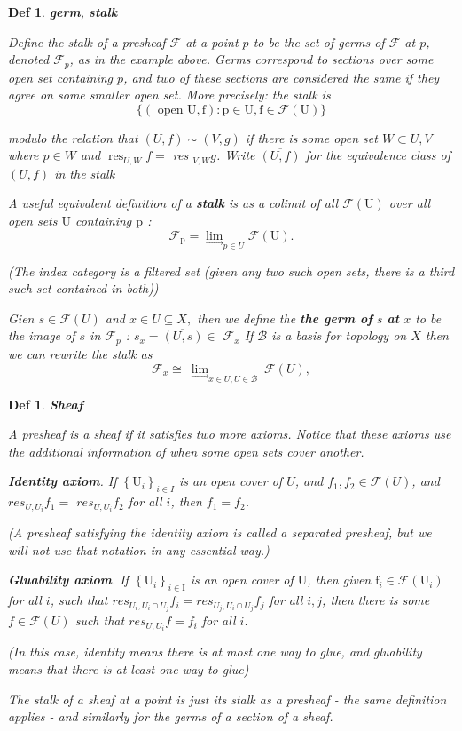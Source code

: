 \documentclass{article}
\newtheorem{definition}[theorem]{Def}
\begin{document}
\begin{definition}
    \textbf{germ},
    \textbf{stalk}

    Define the stalk of a presheaf $\mathcal{F}$ at a point $p$ to be the set of germs of $\mathcal{F}$ at $p$, denoted $\mathcal{F}_{p}$, as in the example above. Germs correspond to sections over some open set containing $p$, and two of these sections are considered the same if they agree on some smaller open set. More precisely: the stalk is
$$
\{(\text { open } \mathrm{U},\mathrm{f}): \mathrm{p} \in \mathrm{U}, \mathrm{f} \in \mathcal{F}(\mathrm{U})\}
$$

modulo the relation that $(U,f) \sim(V,g)$ if there is some open set $W \subset U, V$ where $p \in W$ and $\operatorname{res}_{U, W} f=$ res $_{V, W} g$. Write $\overline{(U,f)}$ for the equivalence class of $(U,f)$ in the stalk

A useful equivalent definition of a \textbf{stalk} is as a colimit of all $\mathcal{F}(\mathrm{U})$ over all open sets $\mathrm{U}$ containing $\mathrm{p}$ :
$$
\mathcal{F}_{\mathrm{p}}={\lim _{\longrightarrow} }_{p\in U}\mathcal{F}(\mathrm{U}) .
$$

(The index category is a filtered set (given any two such open sets, there is a third such set contained in both))

Gien $s\in{\mathcal{F}}(U)$ and $x\in U\subseteq X,$ then we define the \textbf{the germ of} $s$ \textbf{at} $x$ to be the image of $s$ in $\mathcal{F}_{p}$ : $s_{x}=\overline{{{(U,s)}}}\in$  ${\mathcal{F}}_{x}$ 
If $\mathcal B$ is a basis for topology on $X$  then we can rewrite the stalk as
$$
{\mathcal{F}}_{x}\cong\
{\lim _{\longrightarrow} }_{ x\in U,U\in{\mathcal{B}}}\ {\mathcal{F}}(U), 
$$
\end{definition}
\begin{definition}
\textbf{Sheaf}

A presheaf is a sheaf if it satisfies two more axioms. Notice that these axioms use the additional information of when some open sets cover another.

\textbf{Identity axiom}. If $\left\{\mathrm{U}_{i}\right\}_{i \in I}$ is an open cover of $U$, and $f_{1}, f_{2} \in \mathcal{F}(U)$, and $res_{U, U_{i}} f_{1}=$ $res_{U, U_{i}} f_{2}$ for all $i$, then $f_{1}=f_{2}$.

(A presheaf satisfying the identity axiom is called a separated presheaf, but we will not use that notation in any essential way.)

\textbf{Gluability axiom}. If $\left\{\mathrm{U}_{i}\right\}_{i \in \mathrm{I}}$ is an open cover of $\mathrm{U}$, then given $\mathrm{f}_{i} \in \mathcal{F}\left(\mathrm{U}_{i}\right)$ for all $i$, such that $res_{U_{i}, U_{i} \cap U_{j}} f_{i}=res_{U_{j}, U_{i} \cap U_{j}} f_{j}$ for all $i, j$, then there is some $f \in \mathcal{F}(U)$ such that $res_{U, U_{i}} f=f_{i}$ for all $i$.

(In this case, identity means there is at most one way to glue, and gluability
means that there is at least one way to glue)

The stalk of a sheaf at a point is just its stalk as a presheaf - the same definition applies - and similarly for the germs of a section of a sheaf.
\label{def 2.6}
\end{definition}
\end{document}
